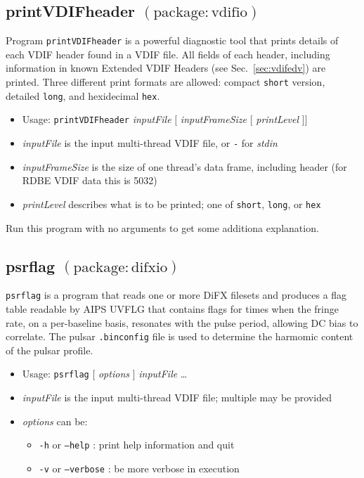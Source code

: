
\subsection{printVDIFheader {\small $\mathrm{(package: vdifio)}$}} \label{sec:printVDIFheader}

Program {\tt printVDIFheader} is a powerful diagnostic tool that prints details of each VDIF header found in a VDIF file.
All fields of each header, including information in known Extended VDIF Headers (see Sec.~\ref{sec:vdifedv}) are printed.
Three different print formats are allowed: compact {\tt short} version, detailed {\tt long}, and hexidecimal {\tt hex}.

\begin{itemize}
\item[] Usage: {\tt printVDIFheader} {\em inputFile} $ [ $ {\em inputFrameSize} $ [ $ {\em printLevel} $ ] ] $
\item[] {\em inputFile} is the input multi-thread VDIF file, or {\tt -} for {\em stdin}
\item[] {\em inputFrameSize} is the size of one thread's data frame, including header (for RDBE VDIF data this is 5032)
\item[] {\em printLevel} describes what is to be printed; one of {\tt short}, {\tt long}, or {\tt hex}
\end{itemize}

Run this program with no arguments to get some additiona explanation.





\subsection{psrflag {\small $\mathrm{(package: difxio)}$}} \label{sec:psrflag}

{\tt psrflag} is a program that reads one or more DiFX filesets and produces a flag table readable by AIPS UVFLG that contains flags for times when the fringe rate, on a per-baseline basis, resonates with the pulse period, allowing DC bias to correlate.
The pulsar {\tt .binconfig} file is used to determine the harmomic content of the pulsar profile.

\begin{itemize}
\item[] Usage: {\tt psrflag} $ [ $ {\em options} $ ] $ {\em inputFile} \ldots
\item[] {\em inputFile} is the input multi-thread VDIF file; multiple may be provided
\item[] {\em options} can be:
\begin{itemize}
\item[] {\tt -h} or {\tt --help} : print help information and quit
\item[] {\tt -v} or {\tt --verbose} : be more verbose in execution
\end{itemize}
\end{itemize}


